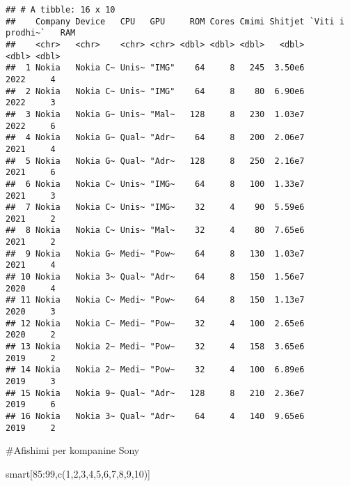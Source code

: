 \documentclass[
]{article}
\newenvironment{Shaded}{\begin{snugshade}}{\end{snugshade}}
\newcommand{\DecValTok}[1]{\textcolor[rgb]{0.00,0.00,0.81}{#1}}
\newcommand{\FunctionTok}[1]{\textcolor[rgb]{0.00,0.00,0.00}{#1}}
\newcommand{\NormalTok}[1]{#1}
\newcommand{\SpecialCharTok}[1]{\textcolor[rgb]{0.00,0.00,0.00}{#1}}
\begin{document}
\begin{verbatim}
## # A tibble: 16 x 10
##    Company Device   CPU   GPU     ROM Cores Cmimi Shitjet `Viti i prodhi~`   RAM
##    <chr>   <chr>    <chr> <chr> <dbl> <dbl> <dbl>   <dbl>            <dbl> <dbl>
##  1 Nokia   Nokia C~ Unis~ "IMG"    64     8   245  3.50e6             2022     4
##  2 Nokia   Nokia C~ Unis~ "IMG"    64     8    80  6.90e6             2022     3
##  3 Nokia   Nokia G~ Unis~ "Mal~   128     8   230  1.03e7             2022     6
##  4 Nokia   Nokia G~ Qual~ "Adr~    64     8   200  2.06e7             2021     4
##  5 Nokia   Nokia G~ Qual~ "Adr~   128     8   250  2.16e7             2021     6
##  6 Nokia   Nokia C~ Unis~ "IMG~    64     8   100  1.33e7             2021     3
##  7 Nokia   Nokia C~ Unis~ "IMG~    32     4    90  5.59e6             2021     2
##  8 Nokia   Nokia C~ Unis~ "Mal~    32     4    80  7.65e6             2021     2
##  9 Nokia   Nokia G~ Medi~ "Pow~    64     8   130  1.03e7             2021     4
## 10 Nokia   Nokia 3~ Qual~ "Adr~    64     8   150  1.56e7             2020     4
## 11 Nokia   Nokia C~ Medi~ "Pow~    64     8   150  1.13e7             2020     3
## 12 Nokia   Nokia C~ Medi~ "Pow~    32     4   100  2.65e6             2020     2
## 13 Nokia   Nokia 2~ Medi~ "Pow~    32     4   158  3.65e6             2019     2
## 14 Nokia   Nokia 2~ Medi~ "Pow~    32     4   100  6.89e6             2019     3
## 15 Nokia   Nokia 9~ Qual~ "Adr~   128     8   210  2.36e7             2019     6
## 16 Nokia   Nokia 3~ Qual~ "Adr~    64     4   140  9.65e6             2019     2
\end{verbatim}

\#Afishimi per kompanine Sony

\begin{Shaded}
\begin{Highlighting}[]
\NormalTok{smart[}\DecValTok{85}\SpecialCharTok{:}\DecValTok{99}\NormalTok{,}\FunctionTok{c}\NormalTok{(}\DecValTok{1}\NormalTok{,}\DecValTok{2}\NormalTok{,}\DecValTok{3}\NormalTok{,}\DecValTok{4}\NormalTok{,}\DecValTok{5}\NormalTok{,}\DecValTok{6}\NormalTok{,}\DecValTok{7}\NormalTok{,}\DecValTok{8}\NormalTok{,}\DecValTok{9}\NormalTok{,}\DecValTok{10}\NormalTok{)]}
\end{Highlighting}
\end{Shaded}
\end{document}
